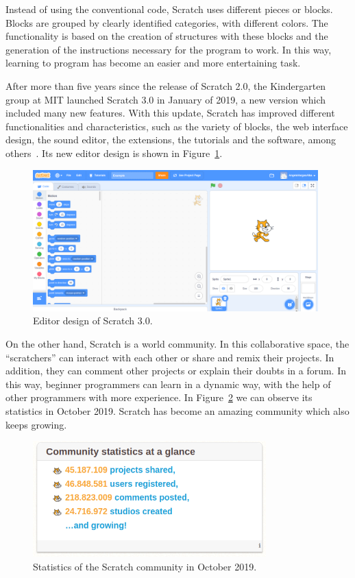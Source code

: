 Instead of using the conventional code, Scratch uses different pieces or blocks. Blocks are grouped by clearly identified categories, with different colors. The functionality is based on the creation of structures with these blocks and the generation of the instructions necessary for the program to work. In this way, learning to program has become an easier and more entertaining task.

After more than five years since the release of Scratch 2.0, the Kindergarten group at MIT launched Scratch 3.0 in January of 2019, a new version which included many new features. With this update, Scratch has improved different functionalities and characteristics, such as the variety of blocks, the web interface design, the sound editor, the extensions, the tutorials and the software, among others~\cite{nin:_scratch3.0}. Its new editor design is shown in Figure~\ref{fig:scratch}.


\begin{figure}
  \centering
  \includegraphics[width=11cm, keepaspectratio]{img/scratch.png}
  \caption{Editor design of Scratch 3.0.}
  \label{fig:scratch}
\end{figure}

On the other hand, Scratch is a world community. In this collaborative space, the ``scratchers'' can interact with each other or share and remix their projects. In addition, they can comment other projects or explain their doubts in a forum. In this way, beginner programmers can learn in a dynamic way, with the help of other programmers with more experience. In Figure~\ref{fig:statistics_scratch} we can observe its statistics in October 2019. Scratch has become an amazing community which also keeps growing. 

\begin{figure}
  \centering
  \includegraphics[width=9cm, keepaspectratio]{img/statistics_scratch.png}
  \caption{Statistics of the Scratch community in October 2019.}
  \label{fig:statistics_scratch}
\end{figure}



